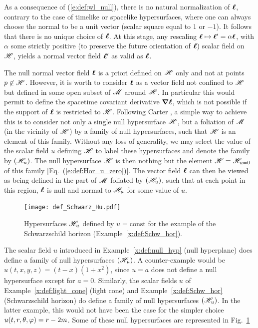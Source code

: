\begin{remark}
As a consequence of (\ref{e:def:wl_null}), there is no natural normalization
of $\bm{\ell}$, contrary to the case of timelike or spacelike hypersurfaces,
where one can always choose the normal to be a unit vector
(scalar square equal to $1$ or $-1$). It follows that there is no unique choice
of $\bm{\ell}$. At this stage, any rescaling $\bm{\ell} \mapsto \bm{\ell}' =  \alpha \bm{\ell}$, with
$\alpha$ some strictly positive (to preserve the future orientation of $\bm{\ell}$)
scalar field on $\mathscr{H}$,
yields a normal vector field $\bm{\ell}'$ as valid as $\bm{\ell}$.
\end{remark}
The null normal vector field $\bm{\ell}$ is a priori defined on $\mathscr{H}$
only and not at points $p\not\in\mathscr{H}$.
However, it is worth to consider $\bm{\ell}$ as a vector field
not confined to $\mathscr{H}$ but defined
in some open subset of $\mathscr{M}$ around $\mathscr{H}$.
In particular this would permit to define the spacetime covariant
derivative $\bm{\nabla}\bm{\ell}$, which is not possible if the
support of $\bm{\ell}$ is restricted to $\mathscr{H}$.
Following Carter \cite{Carte97}, a simple way to achieve
this is to consider not only a single null hypersurface $\mathscr{H}$,
but a foliation of $\mathscr{M}$ (in the vicinity
of $\mathscr{H}$) by a family of null hypersurfaces, such that $\mathscr{H}$ is an
element of this family.
Without any loss of generality,
we may select the value of the scalar field $u$ defining $\mathscr{H}$ to label these hypersurfaces and
denote the family by $(\mathscr{H}_u)$. The null hypersurface $\mathscr{H}$
is then nothing but the element $\mathscr{H} = \mathscr{H}_{u=0}$ of this family
[Eq.~(\ref{e:def:Hor_u_zero})].
The vector field $\bm{\ell}$ can then be viewed as being defined in the part of $\mathscr{M}$
foliated by $(\mathscr{H}_u)$, such that at each point in this region, $\bm{\ell}$
is null and normal to $\mathscr{H}_u$ for some value of $u$.

\begin{figure}
\centerline{\texttt{[image: def\_Schwarz\_Hu.pdf]}}
\caption[]{\label{f:def:Schwarz_Hu} \footnotesize
Hypersurfaces $\mathscr{H}_u$ defined by $u=\mathrm{const}$ for the example
of the Schwarzschild horizon (Example~\ref{x:def:Schw_hor}).}
\end{figure}



\begin{example}
The scalar field $u$ introduced in Example~\ref{x:def:null_hyp}
(null hyperplane) does define a family of null hypersurfaces
$(\mathscr{H}_u)$. A counter-example would be $u(t,x,y,z)=(t-x)(1+x^2)$, since
$u=a$ does not define a null hypersurface except for $a=0$.
Similarly, the scalar fields $u$ of
Example~\ref{x:def:light_cone} (light cone)
and Example~\ref{x:def:Schw_hor} (Schwarzschild horizon)
do define a family of null
hypersurfaces $(\mathscr{H}_u)$.
In the latter example, this would not have been the
case for the simpler choice $u(t,r,\theta,\varphi)  = r - 2m$.
Some of these null hypersurfaces are represented in Fig.~\ref{f:def:Schwarz_Hu}
\end{example}

